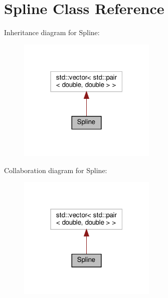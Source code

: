 \hypertarget{classSpline}{}\section{Spline Class Reference}
\label{classSpline}


Inheritance diagram for Spline\+:\nopagebreak
\begin{figure}[H]
\begin{center}
\leavevmode
\includegraphics[width=187pt]{classSpline__inherit__graph}
\end{center}
\end{figure}


Collaboration diagram for Spline\+:\nopagebreak
\begin{figure}[H]
\begin{center}
\leavevmode
\includegraphics[width=187pt]{classSpline__coll__graph}
\end{center}
\end{figure}
